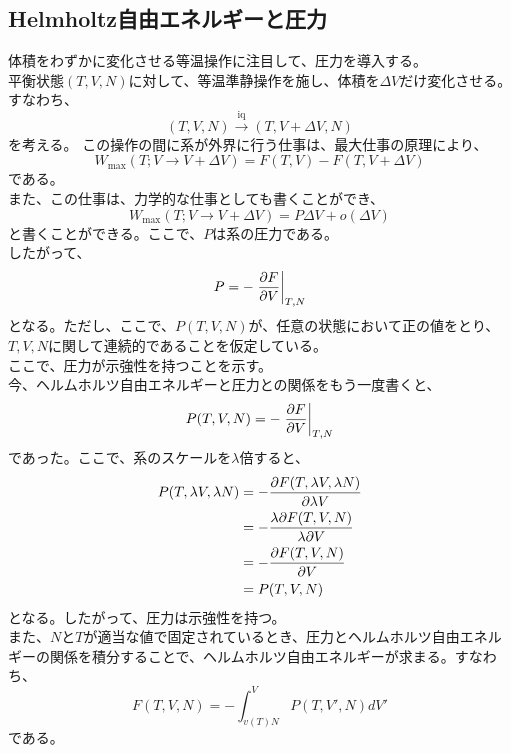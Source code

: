 \documentclass[a4paper,11pt]{jsarticle}
\numberwithin{equation}{section}
\begin{document}
\subsection{Helmholtz自由エネルギーと圧力}
体積をわずかに変化させる等温操作に注目して、圧力を導入する。\\
平衡状態$(T,V,N)$に対して、等温準静操作を施し、体積を$\Delta V$だけ変化させる。すなわち、
\begin{equation}
    (T,V,N) \xrightarrow{\text{iq}} (T,V+\Delta V,N)
\end{equation}
を考える。
この操作の間に系が外界に行う仕事は、最大仕事の原理により、
\begin{equation}
    W_{\text{max}}(T;V\rightarrow V+\Delta V) = F(T,V)-F(T,V+\Delta V)
\end{equation}
である。\\
また、この仕事は、力学的な仕事としても書くことができ、
\begin{equation}
    W_{\text{max}}(T;V\rightarrow V+\Delta V) = P\Delta V + o(\Delta V)
\end{equation}
と書くことができる。ここで、$P$は系の圧力である。\\
したがって、
\begin{equation}
    P = -\left.\pdv{F}{V}\right|_{T,N}
\end{equation}
となる。ただし、ここで、$P(T,V,N)$が、任意の状態において正の値をとり、$T,V,N$に関して連続的であることを仮定している。\\
ここで、圧力が示強性を持つことを示す。\\
今、ヘルムホルツ自由エネルギーと圧力との関係をもう一度書くと、
\begin{equation}
    P(T,V,N) = -\left.\pdv{F}{V}\right|_{T,N}
\end{equation}
であった。ここで、系のスケールを$\lambda$倍すると、
\begin{align}
    P(T,\lambda V,\lambda N) &= -\pdv{F(T,\lambda V,\lambda N)}{\lambda V}\\
    &= -\frac{\lambda \partial F(T,V,N)}{\lambda \partial V}\\
    &= -\pdv{F(T,V,N)}{V}\\
    &= P(T,V,N)
\end{align}
となる。したがって、圧力は示強性を持つ。\\

また、$N$と$T$が適当な値で固定されているとき、圧力とヘルムホルツ自由エネルギーの関係を積分することで、ヘルムホルツ自由エネルギーが求まる。すなわち、
\begin{equation}
    F(T,V,N) = -\int_{v(T)N}^{V}P(T,V',N)dV'
\end{equation}
である。\\
\end{document}
